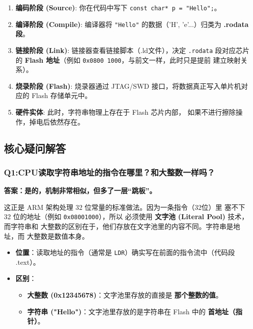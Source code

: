 \begin{enumerate}[label=(\arabic*), wide=0pt]
    \item \textbf{编码阶段 (Source)}: 
    你在代码中写下 \texttt{const char* p = "Hello";}。
    
    \item \textbf{编译阶段 (Compile)}: 
    编译器将 \texttt{"Hello"} 的数据（'H', 'e'...）归类为 \textbf{.rodata 段}。
    
    \item \textbf{链接阶段 (Link)}: 
    链接器查看链接脚本（.ld文件），决定 \texttt{.rodata} 
    段对应芯片的 \textbf{Flash 地址}（例如 \texttt{0x0800 1000}，与前文一样，此时只是提前
    建立映射关系）。
    
    \item \textbf{烧录阶段 (Flash)}: 
    烧录器通过 JTAG/SWD 接口，将数据真正写入单片机对应的 Flash 存储单元中。
    
    \item \textbf{硬件实体}: 
    此时，字符串物理上存在于 Flash 芯片内部，
    如果不进行擦除操作，掉电后依然存在。
\end{enumerate}


\subsection{核心疑问解答}

\subsubsection{Q1:CPU读取字符串地址的指令在哪里？和大整数一样吗？}

\textbf{答案：是的，机制非常相似，但多了一层“跳板”。}

\vspace{1em}

这正是 ARM 架构处理 32 位常量的标准做法。因为一条指令（32位）里
塞不下 32 位的地址（例如 \texttt{0x08001000}），所以
必须使用 \textbf{文字池 (Literal Pool)} 技术，而字符串和
大整数的区别在于，他们存放在文字池里的内容不同。字符串是地址，而
大整数是数值本身。

\begin{itemize}
    \item \textbf{位置}：读取地址的指令（通常是 \texttt{LDR}）确实写在前面的指令流中（代码段 .text）。
    \item \textbf{区别}：
    \begin{itemize}
        \item \textbf{大整数 (0x12345678)}：文字池里存放的直接是 \textbf{那个整数的值}。
        \item \textbf{字符串 ("Hello")}：文字池里存放的是字符串在 Flash 中的 \textbf{首地址（指针）}。
    \end{itemize}
\end{itemize}


